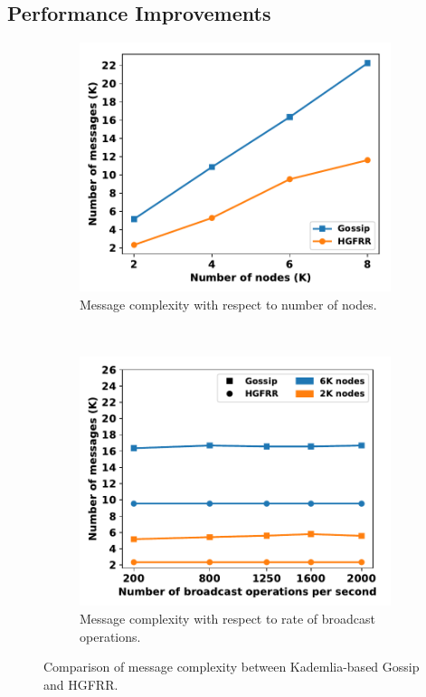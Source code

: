   
\subsection{Performance Improvements}

\begin{figure}[ht]
  \centering
    \begin{subfigure}[b]{0.23\textwidth}
    \includegraphics[width=\textwidth]{figures/hgfr_ourgossip_num_msg_on_num_node.pdf}
    \caption{Message complexity with respect to number of nodes.}
    \label{hgfr_ourgossip_num_msg_on_num_node}
    \end{subfigure}
    ~
    \begin{subfigure}[b]{0.23\textwidth}
	  \includegraphics[width=\textwidth]{figures/hgfr_ourgossip_num_msg_on_tps.pdf}
	  \caption{Message complexity with respect to rate of broadcast operations.}
    \label{hgfr_ourgossip_num_msg_on_tps}
    \end{subfigure}

	\caption{Comparison of message complexity between Kademlia-based Gossip and HGFRR.}
	\label{fig_hgfr_ourgossip_msg}
	\vspace{-0.5cm}
\end{figure}
  

